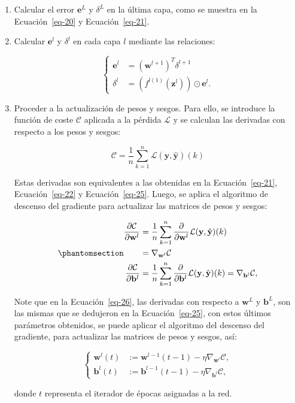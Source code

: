 \documentclass[
  us-letterpaper,
]{scrreprt}
\theoremstyle{plain}
\theoremstyle{definition}
\theoremstyle{plain}
\theoremstyle{definition}
\theoremstyle{remark}
\begin{document}
\begin{enumerate}
\def\labelenumi{\arabic{enumi}.}
\item
  Calcular el error \(\mathbf e^L\) y \(\delta^L\) en la última capa,
  como se muestra en la Ecuación~\ref{eq-20} y Ecuación~\ref{eq-21}.
\item
  Calcular \(\mathbf e^l\) y \(\delta^l\) en cada capa \(l\) mediante
  las relaciones:

  \[
  \begin{cases}\mathbf e^l&= (\mathbf w^{l+1})^T\delta^{l+1}\\ \delta^l &= (f^{l(1)}(\mathbf z^l))\odot \mathbf e^l.\end{cases}
  \]
\item
  Proceder a la actualización de pesos y sesgos. Para ello, se introduce
  la función de coste \(\mathcal C\) aplicada a la pérdida
  \(\mathcal L\) y se calculan las derivadas con respecto a los pesos y
  sesgos:

  \[
  \mathcal C=\frac{1}{n}\sum_{k=1}^n \mathcal L(\mathbf y, \mathbf{\hat{y}})(k)
  \]

  Estas derivadas son equivalentes a las obtenidas en la
  Ecuación~\ref{eq-21}, Ecuación~\ref{eq-22} y Ecuación~\ref{eq-25}.
  Luego, se aplica el algoritmo de descenso del gradiente para
  actualizar las matrices de pesos y sesgos:

  \begin{equation}\phantomsection\label{eq-26}{
  \begin{split}\frac{\partial \mathcal C}{\partial \mathbf w^l}&=\frac{1}{n}\sum_{k=1}^n \frac{\partial}{\partial \mathbf w^l}\mathcal L(\mathbf y, \hat{\mathbf y})(k)\\ &=\nabla_{\mathbf w^l}\mathcal C\\ 
  \frac{\partial\mathcal C}{\partial\mathbf b^l}&= \frac{1}{n}\sum_{k=1}^n \frac{\partial}{\partial \mathbf b^l}\mathcal L(\mathbf y, \hat{\mathbf y})(k)=\nabla_{\mathbf b^l}\mathcal C,\end{split}
  }\end{equation}

  Note que en la Ecuación~\ref{eq-26}, las derivadas con respecto a
  \(\mathbf w^L\) y \(\mathbf b^L\), son las mismas que se dedujeron en
  la Ecuación~\ref{eq-25}, con estos últimos parámetros obtenidos, se
  puede aplicar el algoritmo del descenso del gradiente, para actualizar
  las matrices de pesos y sesgos, así:

  \[
  \begin{cases}\mathbf w^l(t)&:= \mathbf w^{l-1}(t-1)-\eta\nabla_{\mathbf w^l}\mathcal C,\\ \mathbf b^l(t)&:= \mathbf b^{l-1}(t-1)-\eta\nabla_{\mathbf b^l}\mathcal C,\end{cases}
  \]

  donde \(t\) representa el iterador de épocas asignadas a la red.
\end{enumerate}
\end{document}
